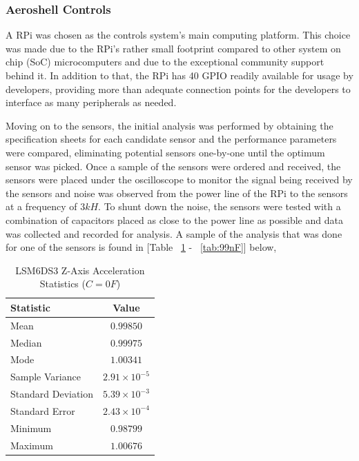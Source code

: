 
\subsubsection{Aeroshell Controls}

\indent\indent A RPi was chosen as the controls system's main computing platform. This choice was made due to the RPi's rather small footprint compared to other system on chip (SoC) microcomputers and due to the exceptional community support behind it. In addition to that, the RPi has 40 GPIO readily available for usage by developers, providing more than adequate connection points for the developers to interface as many peripherals as needed.

Moving on to the sensors, the initial analysis was performed by obtaining the specification sheets for each candidate sensor and the performance parameters were compared, eliminating potential sensors one-by-one until the optimum sensor was picked. Once a sample of the sensors were ordered and received, the sensors were placed under the oscilloscope to monitor the signal being received by the sensors and noise was observed from the power line of the RPi to the sensors at a frequency of $3kH$. To shunt down the noise, the sensors were tested with a combination of capacitors placed as close to the power line as possible and data was collected and recorded for analysis. A sample of the analysis that was done for one of the sensors is found in [Table ~\ref{tab:no_cap} - ~\ref{tab:99nF}] below,

\begin{table}[H]
\caption{\label{tab:no_cap} LSM6DS3 Z-Axis Acceleration Statistics ($C=0F$)}
\centering
\begin{tabular}{l|c}
\hline\hline
\textbf{Statistic}      & \textbf{Value}            \\\hline
Mean                    & $0.99850$                 \\\hline
Median                  & $0.99975$                 \\\hline
Mode  	                & $1.00341$                 \\\hline
Sample Variance         & $2.91\times10^{\minus5}$  \\\hline
Standard Deviation      & $5.39\times10^{\minus3}$  \\\hline
Standard Error  	    & $2.43\times10^{\minus4}$  \\\hline
Minimum                 & $0.98799$                 \\\hline
Maximum                 & $1.00676$                 \\\hline
\end{tabular}
\end{table}

